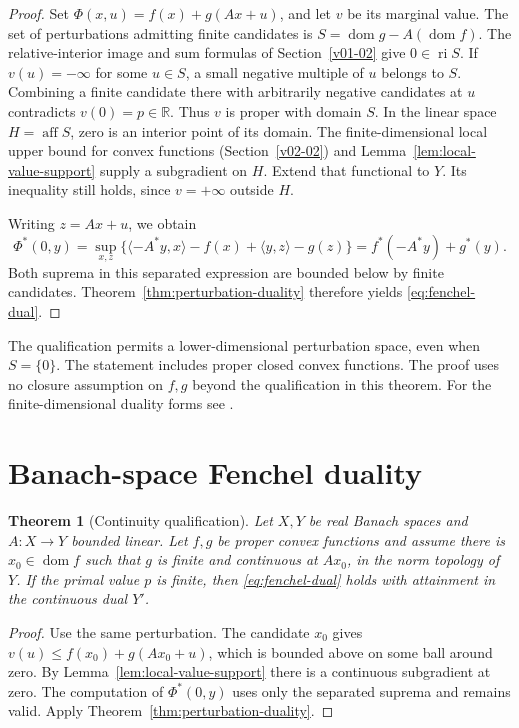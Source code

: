 \documentclass[11pt,oneside,openany]{book}
\newcommand{\R}{\mathbb R}
\theoremstyle{plain}
\newtheorem{theorem}{Theorem}[chapter]
\theoremstyle{definition}
\theoremstyle{remark}
\begin{document}
\begin{proof}
Set \(\Phi(x,u)=f(x)+g(Ax+u)\), and let \(v\) be its marginal
value. The set of perturbations admitting finite candidates
is \(S=\operatorname{dom}g-A(\operatorname{dom}f)\).
The relative-interior image and sum formulas of
Section~\ref{v01-02} give \(0\in\operatorname{ri}S\). If
\(v(u)=-\infty\) for some \(u\in S\), a small negative multiple
of \(u\) belongs to \(S\). Combining a finite candidate
there with arbitrarily negative candidates at \(u\) contradicts
\(v(0)=p\in\R\). Thus \(v\) is proper with domain \(S\).
In the linear space \(H=\operatorname{aff}S\), zero is an
interior point of its domain. The finite-dimensional local
upper bound for convex functions (Section~\ref{v02-02})
and Lemma~\ref{lem:local-value-support} supply a subgradient
on \(H\). Extend that functional to \(Y\). Its inequality
still holds, since \(v=+\infty\) outside \(H\).

Writing \(z=Ax+u\), we obtain
\[
 \Phi^*(0,y)=\sup_{x,z}
 \{\langle -A^*y,x\rangle-f(x)+\langle y,z\rangle-g(z)\}
 = f^*(-A^*y)+g^*(y).
\]
Both suprema in this separated expression are bounded below
by finite candidates. Theorem~\ref{thm:perturbation-duality}
therefore yields \eqref{eq:fenchel-dual}.
\end{proof}

The qualification permits a lower-dimensional perturbation
space, even when \(S=\{0\}\). The statement includes proper
closed convex functions. The proof uses no closure assumption
on \(f,g\) beyond the qualification in this theorem.
For the finite-dimensional duality forms see
\cite[Theorems 31.1--31.3]{Rockafellar}.

\section{Banach-space Fenchel duality}
\label{v04-03}

\begin{theorem}[Continuity qualification]\label{thm:banach-fenchel}
Let \(X,Y\) be real Banach spaces and \(A:X\to Y\)
bounded linear. Let \(f,g\) be proper convex functions and
assume there is \(x_0\in\operatorname{dom}f\) such that
\(g\) is finite and continuous at \(Ax_0\), in the norm
topology of \(Y\). If the primal value \(p\) is finite,
then \eqref{eq:fenchel-dual} holds with attainment in the
continuous dual \(Y'\).
\end{theorem}

\begin{proof}
Use the same perturbation. The candidate \(x_0\) gives
\(v(u)\le f(x_0)+g(Ax_0+u)\), which is bounded above on some
ball around zero. By Lemma~\ref{lem:local-value-support}
there is a continuous subgradient at zero. The computation
of \(\Phi^*(0,y)\) uses only the separated suprema and
remains valid. Apply Theorem~\ref{thm:perturbation-duality}.
\end{proof}
\end{document}
